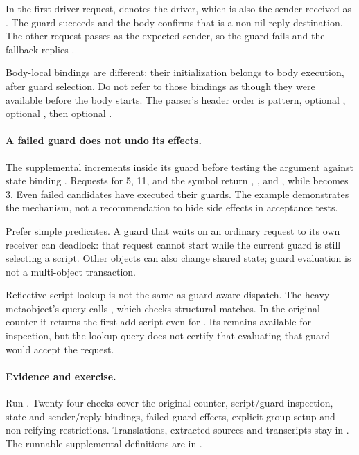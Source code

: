 
In the first driver request,  denotes the driver, which is
also the sender received as . The guard succeeds and the body
confirms that  is a non-nil reply destination. The other request
passes  as the expected sender, so the guard fails and the
fallback replies .

Body-local  bindings are different: their initialization
belongs to body execution, after guard selection. Do not refer to those
bindings as though they were available before the body starts.
The parser's header order is pattern, optional , optional
, then optional .

\paragraph{A failed guard does not undo its effects.}
The supplemental  increments  inside
its guard before testing the argument against state binding .
Requests for 5, 11, and the symbol  return
, , and , while
 becomes 3. Even failed candidates have executed their
guards. The example demonstrates the mechanism, not a recommendation
to hide side effects in acceptance tests.


Prefer simple predicates. A guard that waits on an ordinary request
to its own receiver can deadlock: that request cannot start while
the current guard is still selecting a script. Other objects can also
change shared state; guard evaluation is not a multi-object transaction.

Reflective script lookup is not the same as guard-aware dispatch.
The heavy metaobject's  query calls
, which checks structural matches. In the original
counter it returns the first add script even for \code{[:add -1]}.
Its  remains available for inspection, but the lookup
query does not certify that evaluating that guard would accept the request.

\paragraph{Evidence and exercise.}
Run . Twenty-four checks cover the
original counter, script/guard inspection, state and sender/reply bindings,
failed-guard effects, explicit-group setup and non-reifying restrictions.
Translations, extracted sources and transcripts stay in
. The runnable supplemental definitions are in
.

